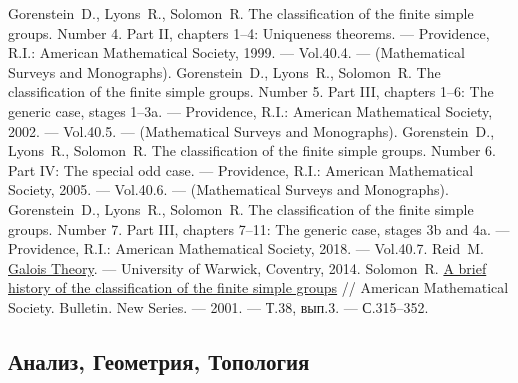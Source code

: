 \begin{thebibliography}{199}
 Gorenstein~D., Lyons~R., Solomon~R. The classification of the finite simple groups. Number 4. Part II, chapters 1--4: Uniqueness theorems. --- Providence, R.I.: American Mathematical Society, 1999. --- Vol.40.4. --- (Mathematical Surveys and Monographs).
 Gorenstein~D., Lyons~R., Solomon~R. The classification of the finite simple groups. Number 5. Part III, chapters 1--6: The generic case, stages 1–3a. --- Providence, R.I.: American Mathematical Society, 2002. --- Vol.40.5. --- (Mathematical Surveys and Monographs).
 Gorenstein~D., Lyons~R., Solomon~R. The classification of the finite simple groups. Number 6. Part IV: The special odd case. --- Providence, R.I.: American Mathematical Society, 2005. --- Vol.40.6. --- (Mathematical Surveys and Monographs).
 Gorenstein~D., Lyons~R., Solomon~R. The classification of the finite simple groups. Number 7. Part III, chapters 7--11: The generic case, stages 3b and 4a. --- Providence, R.I.: American Mathematical Society, 2018. --- Vol.40.7.
 Reid~M. \href{https://homepages.warwick.ac.uk/~masda/MA3D5/Galois.pdf}{Galois Theory}. --- University of Warwick, Coventry, 2014.
 Solomon~R. \href{http://www.ams.org/bull/2001-38-03/S0273-0979-01-00909-0/S0273-0979-01-00909-0.pdf}{A brief history of the classification of the finite simple groups} // American Mathematical Society. Bulletin. New Series. --- 2001. --- Т.38, вып.3. --- С.315--352.


\subsection*{Анализ, Геометрия, Топология}


\end{thebibliography}

